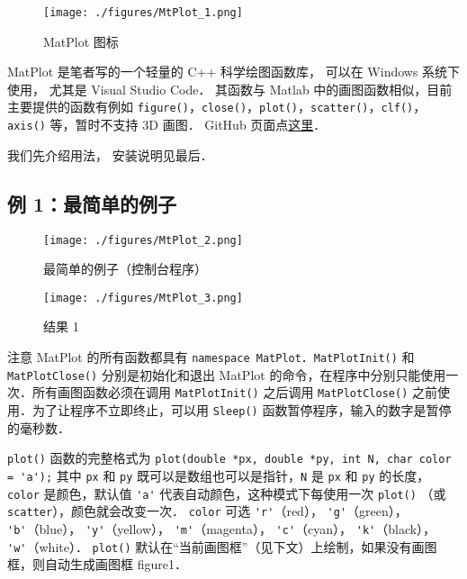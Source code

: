 
\begin{figure}[ht]
\centering
\texttt{[image: ./figures/MtPlot\_1.png]}
\caption{MatPlot 图标} \label{MtPlot_fig1}
\end{figure}

MatPlot 是笔者写的一个轻量的 C++ 科学绘图函数库， 可以在 Windows 系统下使用， 尤其是 Visual Studio Code． 其函数与 Matlab 中的画图函数相似，目前主要提供的函数有例如 \verb|figure()|，\verb|close()|，\verb|plot()|，\verb|scatter()|，\verb|clf()|，\verb|axis()| 等，暂时不支持 3D 画图． GitHub 页面点\href{https://github.com/MacroUniverse/MatPlot}{这里}．

我们先介绍用法， 安装说明见最后．

\subsection{例 1：最简单的例子}

\begin{figure}[ht]
\centering
\texttt{[image: ./figures/MtPlot\_2.png]}
\caption{最简单的例子（控制台程序）} \label{MtPlot_fig2}
\end{figure}

\begin{figure}[ht]
\centering
\texttt{[image: ./figures/MtPlot\_3.png]}
\caption{结果 1} \label{MtPlot_fig3}
\end{figure}

注意 MatPlot 的所有函数都具有 \verb|namespace MatPlot|．\verb|MatPlotInit()| 和 \verb|MatPlotClose()| 分别是初始化和退出 MatPlot 的命令，在程序中分别只能使用一次．所有画图函数必须在调用 \verb|MatPlotInit()| 之后调用 \verb|MatPlotClose()| 之前使用．为了让程序不立即终止，可以用 \verb|Sleep()| 函数暂停程序，输入的数字是暂停的毫秒数．

\verb|plot()| 函数的完整格式为
\verb|plot(double *px, double *py, int N, char color = 'a');|
其中 \verb|px| 和 \verb|py| 既可以是数组也可以是指针，\verb|N| 是 \verb|px| 和 \verb|py| 的长度，\verb|color| 是颜色，默认值 \verb|'a'| 代表自动颜色，这种模式下每使用一次 \verb|plot()| （或 \verb|scatter|），颜色就会改变一次． \verb|color| 可选
\verb|'r'|（red），
\verb|'g'|（green），
\verb|'b'|（blue），
\verb|'y'|（yellow），
\verb|'m'|（magenta），
\verb|'c'|（cyan），
\verb|'k'|（black），
\verb|'w'|（white）．
\verb|plot()| 默认在“当前画图框”（见下文）上绘制，如果没有画图框，则自动生成画图框 figure1．

